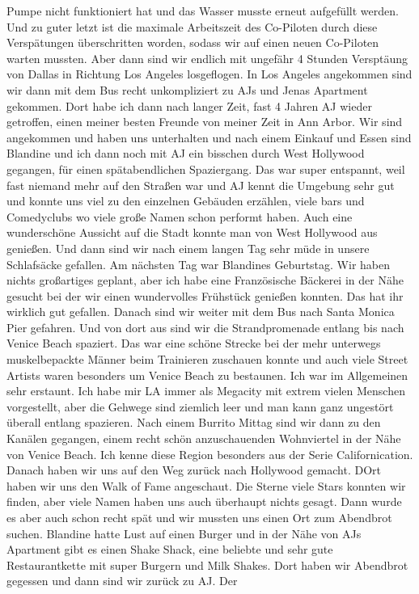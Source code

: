 \documentclass[11pt]{book}
\begin{document}
Pumpe nicht funktioniert hat und das Wasser musste erneut aufgefüllt werden. Und zu guter letzt ist die maximale Arbeitszeit des Co-Piloten durch diese 
Verspätungen überschritten worden, sodass wir auf einen neuen Co-Piloten warten mussten. Aber dann sind wir endlich mit ungefähr 4 Stunden Versptäung 
von Dallas in Richtung Los Angeles losgeflogen. 
In Los Angeles angekommen sind wir dann mit dem Bus recht unkompliziert zu AJs und Jenas Apartment gekommen. Dort habe ich dann nach langer Zeit, fast 
4 Jahren AJ wieder getroffen, einen meiner besten Freunde von meiner Zeit in Ann Arbor. Wir sind angekommen und haben uns unterhalten und nach einem Einkauf 
und Essen sind Blandine und ich dann noch mit AJ ein bisschen durch West Hollywood gegangen, für einen spätabendlichen Spaziergang. Das war super entspannt, 
weil fast niemand mehr auf den Straßen war und AJ kennt die Umgebung sehr gut und konnte uns viel zu den einzelnen Gebäuden erzählen, viele bars und 
Comedyclubs wo viele große Namen schon performt haben. Auch eine wunderschöne Aussicht auf die Stadt konnte man von West Hollywood aus genießen. 
Und dann sind wir nach einem langen Tag sehr müde in unsere Schlafsäcke gefallen.
Am nächsten Tag war Blandines Geburtstag. Wir haben nichts großartiges geplant, aber ich habe eine Französische Bäckerei in der Nähe gesucht bei der 
wir einen wundervolles Frühstück genießen konnten. Das hat ihr wirklich gut gefallen. Danach sind wir weiter mit dem Bus nach Santa Monica Pier gefahren.
Und von dort aus sind wir die Strandpromenade entlang bis nach Venice Beach spaziert. Das war eine schöne Strecke bei der mehr unterwegs muskelbepackte 
Männer beim Trainieren zuschauen konnte und auch viele Street Artists waren besonders um Venice Beach zu bestaunen. Ich war im Allgemeinen sehr erstaunt. 
Ich habe mir LA immer als Megacity mit extrem vielen Menschen vorgestellt, aber die Gehwege sind ziemlich leer und man kann ganz ungestört überall entlang 
spazieren. Nach einem Burrito Mittag sind wir dann zu den Kanälen gegangen, einem recht schön anzuschauenden Wohnviertel in der Nähe von Venice Beach. 
Ich kenne diese Region besonders aus der Serie Californication. Danach haben wir uns auf den Weg zurück nach Hollywood gemacht. DOrt haben wir uns den Walk 
of Fame angeschaut. Die Sterne viele Stars konnten wir finden, aber viele Namen haben uns auch überhaupt nichts gesagt. Dann wurde es aber auch schon recht 
spät und wir mussten uns einen Ort zum Abendbrot suchen. Blandine hatte Lust auf einen Burger und in der Nähe von AJs Apartment gibt es einen Shake Shack, 
eine beliebte und sehr gute Restaurantkette mit super Burgern und Milk Shakes. Dort haben wir Abendbrot gegessen und dann sind wir zurück zu AJ. Der 
\end{document}
